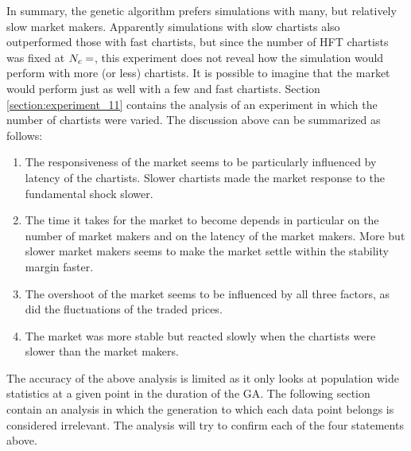 In summary, the genetic algorithm prefers simulations with many, but relatively slow market makers. Apparently simulations with slow chartists also outperformed those with fast chartists, but since the number of HFT chartists was fixed at $N_{c} = $, this experiment does not reveal how the simulation would perform with more (or less) chartists. It is possible to imagine that the market would perform just as well with a few and fast chartists. Section \ref{section:experiment_11} contains the analysis of an experiment in which the number of chartists were varied. The discussion above can be summarized as follows:

\begin{enumerate}
\item The responsiveness of the market seems to be particularly influenced by latency of the chartists. Slower chartists made the market response to the fundamental shock slower.
\item The time it takes for the market to become depends in particular on the number of market makers and on the latency of the market makers. More but slower market makers seems to make the market settle within the stability margin faster.
\item The overshoot of the market seems to be influenced by all three factors, as did the fluctuations of the traded prices.
\item The market was more stable but reacted slowly when the chartists were slower than the market makers.
\end{enumerate}
The accuracy of the above analysis is limited as it only looks at population wide statistics at a given point in the duration of the GA. The following section contain an analysis in which the generation to which each data point belongs is considered irrelevant. The analysis will try to confirm each of the four statements above.




